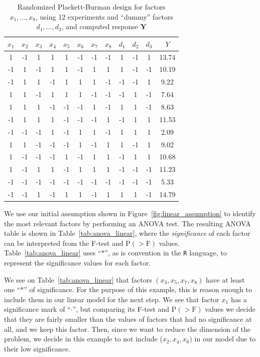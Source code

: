\documentclass[conference]{IEEEtran}
\begin{document}
\begin{table}[ht]
\centering
\caption{Randomized Plackett-Burman design for factors $x_1, \dots, x_8$, using 12 experiments and ``dummy'' factors $d_1, \dots, d_3$, and computed response $\mathbf{Y}$}
\label{tab:plackett}
\begingroup\scriptsize
\begin{tabular}{cccccccccccc}
  \toprule
$x_1$ & $x_2$ & $x_3$ & $x_4$ & $x_5$ & $x_6$ & $x_7$ & $x_8$ & $d_1$ & $d_2$ & $d_3$ & $Y$ \\
  \midrule
1 & -1 & 1 & 1 & 1 & -1 & -1 & -1 & 1 & -1 & 1 & 13.74 \\
  -1 & 1 & -1 & 1 & 1 & -1 & 1 & 1 & 1 & -1 & -1 & 10.19 \\
  -1 & 1 & 1 & -1 & 1 & 1 & 1 & -1 & -1 & -1 & 1 & 9.22 \\
  1 & 1 & -1 & 1 & 1 & 1 & -1 & -1 & -1 & 1 & -1 & 7.64 \\
  1 & 1 & 1 & -1 & -1 & -1 & 1 & -1 & 1 & 1 & -1 & 8.63 \\
  -1 & 1 & 1 & 1 & -1 & -1 & -1 & 1 & -1 & 1 & 1 & 11.53 \\
  -1 & -1 & -1 & 1 & -1 & 1 & 1 & -1 & 1 & 1 & 1 & 2.09 \\
  1 & 1 & -1 & -1 & -1 & 1 & -1 & 1 & 1 & -1 & 1 & 9.02 \\
  1 & -1 & -1 & -1 & 1 & -1 & 1 & 1 & -1 & 1 & 1 & 10.68 \\
  1 & -1 & 1 & 1 & -1 & 1 & 1 & 1 & -1 & -1 & -1 & 11.23 \\
  -1 & -1 & -1 & -1 & -1 & -1 & -1 & -1 & -1 & -1 & -1 & 5.33 \\
  -1 & -1 & 1 & -1 & 1 & 1 & -1 & 1 & 1 & 1 & -1 & 14.79 \\
   \bottomrule
\end{tabular}
\endgroup
\end{table}

We use our initial assumption shown in Figure~\ref{fig:linear_assumption} to
identify the most relevant factors by performing an ANOVA test. The resulting
ANOVA table is shown in Table~\ref{tab:anova_linear}, where the \emph{significance}
of each factor can be interpreted from the F-test and P\((>\text{F})\) values.
Table~\ref{tab:anova_linear} uses ``\(*\)'', as is convention in the \texttt{R}
language, to represent the significance values for each factor.

We see on Table~\ref{tab:anova_linear} that factors \((x_3,x_5,x_7,x_8)\) have at
least one ``\(*\)'' of significance. For the purpose of this example, this is
reason enough to include them in our linear model for the next step. We see that
factor \(x_1\) has a significance mark of ``\(\cdot\)'', but comparing its F-test and
P\((>\text{F})\) values we decide that they are fairly smaller than the values of
factors that had no significance at all, and we keep this factor. Then, since we
want to reduce the dimension of the problem, we decide in this example to not
include (\(x_2,x_4,x_6)\) in our model due to their low significance.
\end{document}
